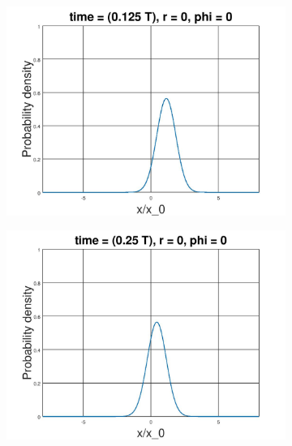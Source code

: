 \documentclass[12pt, twoside]{article}
\begin{document}
\begin{figure}[h!]
	\label{fig:coherent_state}
	\centering
	\begin{subfigure}[h!]{0.3\linewidth}
		\includegraphics[width=\linewidth]{graphs/coherent/1.jpg}
	\end{subfigure}
	\begin{subfigure}[h!]{0.3\linewidth}
		\includegraphics[width=\linewidth]{graphs/coherent/2.jpg}
	\end{subfigure}
	\begin{subfigure}[h!]{0.3\linewidth}

\end{subfigure}
\end{figure}
\end{document}
